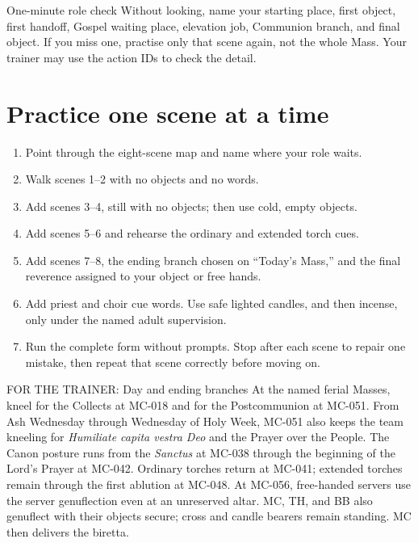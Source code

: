 \begin{learnerbox}{One-minute role check}
Without looking, name your starting place, first object, first handoff, Gospel
waiting place, elevation job, Communion branch, and final object. If you miss
one, practise only that scene again, not the whole Mass. Your trainer may use
the action IDs to check the detail.
\end{learnerbox}

\clearpage
\section{Practice one scene at a time}

\begin{enumerate}
  \item Point through the eight-scene map and name where your role waits.
  \item Walk scenes 1--2 with no objects and no words.
  \item Add scenes 3--4, still with no objects; then use cold, empty objects.
  \item Add scenes 5--6 and rehearse the ordinary and extended torch cues.
  \item Add scenes 7--8, the ending branch chosen on ``Today's Mass,'' and the
  final reverence assigned to your object or free hands.
  \item Add priest and choir cue words. Use safe lighted candles, and then
  incense, only under the named adult supervision.
  \item Run the complete form without prompts. Stop after each scene to repair
  one mistake, then repeat that scene correctly before moving on.
\end{enumerate}

\noindent
{}
\par
{}

\begin{coachbox}{FOR THE TRAINER: Day and ending branches}
At the named ferial Masses, kneel for the Collects at MC-018 and for the
Postcommunion at MC-051. From Ash Wednesday through Wednesday of Holy Week,
MC-051 also keeps the team kneeling for \textit{Humiliate capita vestra Deo}
and the Prayer over the People. The Canon posture runs from the
\textit{Sanctus} at MC-038 through the beginning of the Lord's Prayer at
MC-042. Ordinary torches return at MC-041; extended torches remain through the
first ablution at MC-048. At MC-056, free-handed servers use the
server genuflection even at an unreserved altar. MC, TH, and BB also genuflect
with their objects secure; cross and candle bearers remain standing. MC then
delivers the biretta.
\end{coachbox}


